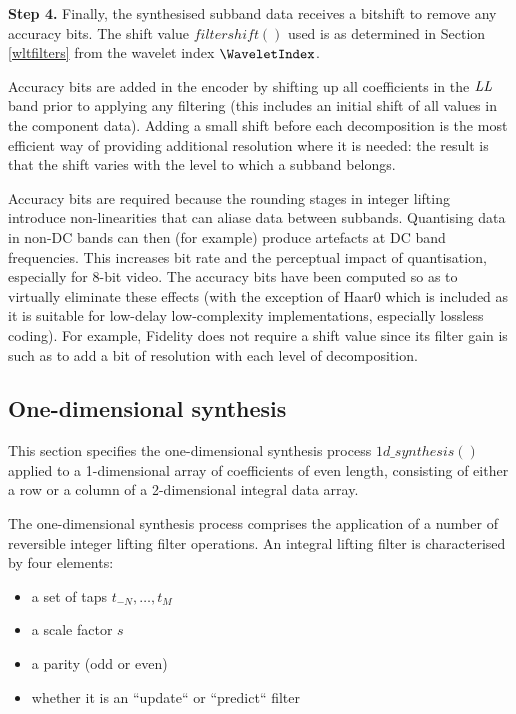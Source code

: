 {\bf Step 4.} Finally, the synthesised subband data receives a bitshift to
remove any accuracy bits. The shift value $filtershift()$ used is as determined in Section \ref{wltfilters}
from the wavelet index $\WaveletIndex$.

\begin{pseudo*}
\bsCODE{\hdots}
    \bsEND
\bsEND
\end{pseudo*}

\begin{informative}
Accuracy bits are added in the encoder by shifting up all coefficients in the 
$\textit{LL}$ band prior to applying any filtering (this includes an initial shift of all 
values in the component data). Adding a small shift before each decomposition
is the most efficient way of providing additional resolution where it is needed:
the result is that the shift varies with the level to which a subband belongs.

Accuracy bits are required because the rounding stages in integer lifting
introduce non-linearities that can aliase data between subbands. Quantising
data in non-DC bands can then (for example) produce artefacts at DC 
band frequencies. This increases bit rate and the perceptual impact of quantisation, 
especially for 8-bit video. The accuracy bits have been computed so as to virtually
eliminate these effects (with the exception of Haar0 which is included as it
is suitable for low-delay low-complexity implementations, especially lossless coding).
For example, Fidelity does not require a shift value since its filter gain is such
as to add a bit of resolution with each level of decomposition.
\end{informative}

\subsection{One-dimensional synthesis}

This section specifies the one-dimensional synthesis process
$1d\_synthesis()$ applied to a 1-dimensional array of coefficients of
even length, consisting
of either a row or a column of a 2-dimensional integral data array.

The one-dimensional synthesis process comprises the application of a
number of reversible integer lifting filter operations. An integral lifting filter
 is characterised by four elements:
\begin{itemize}
\item a set of taps $t_{-N}, \hdots,t_M$
\item a scale factor $s$
\item a parity (odd or even)
\item whether it is an ``update`` or ``predict`` filter
\end{itemize}

